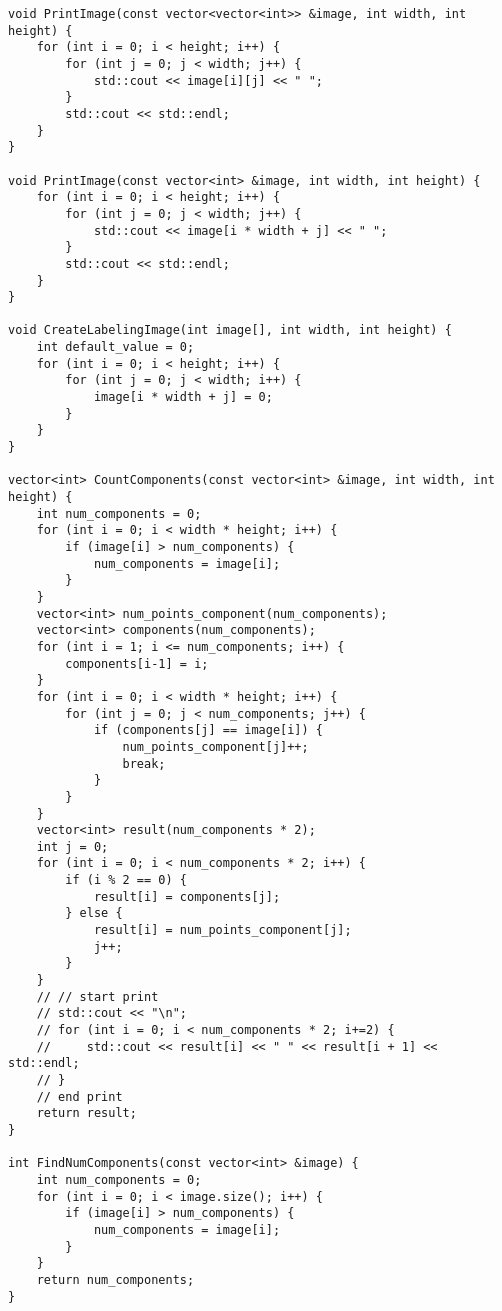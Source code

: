 \documentclass{report}
\begin{document}
\begin{lstlisting}
void PrintImage(const vector<vector<int>> &image, int width, int height) {
    for (int i = 0; i < height; i++) {
        for (int j = 0; j < width; j++) {
            std::cout << image[i][j] << " ";
        }
        std::cout << std::endl;
    }
}

void PrintImage(const vector<int> &image, int width, int height) {
    for (int i = 0; i < height; i++) {
        for (int j = 0; j < width; j++) {
            std::cout << image[i * width + j] << " ";
        }
        std::cout << std::endl;
    }
}

void CreateLabelingImage(int image[], int width, int height) {
    int default_value = 0;
    for (int i = 0; i < height; i++) {
        for (int j = 0; j < width; i++) {
            image[i * width + j] = 0;
        }
    }
}

vector<int> CountComponents(const vector<int> &image, int width, int height) {
    int num_components = 0;
    for (int i = 0; i < width * height; i++) {
        if (image[i] > num_components) {
            num_components = image[i];
        }
    }
    vector<int> num_points_component(num_components);
    vector<int> components(num_components);
    for (int i = 1; i <= num_components; i++) {
        components[i-1] = i;
    }
    for (int i = 0; i < width * height; i++) {
        for (int j = 0; j < num_components; j++) {
            if (components[j] == image[i]) {
                num_points_component[j]++;
                break;
            }
        }
    }
    vector<int> result(num_components * 2);
    int j = 0;
    for (int i = 0; i < num_components * 2; i++) {
        if (i % 2 == 0) {
            result[i] = components[j];
        } else {
            result[i] = num_points_component[j];
            j++;
        }
    }
    // // start print
    // std::cout << "\n";
    // for (int i = 0; i < num_components * 2; i+=2) {
    //     std::cout << result[i] << " " << result[i + 1] << std::endl;
    // }
    // end print
    return result;
}

int FindNumComponents(const vector<int> &image) {
    int num_components = 0;
    for (int i = 0; i < image.size(); i++) {
        if (image[i] > num_components) {
            num_components = image[i];
        }
    }
    return num_components;
}


\end{lstlisting}
\end{document}
